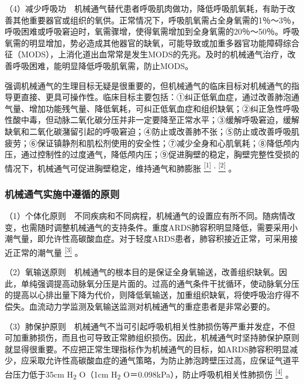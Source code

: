 （4）减少呼吸功　机械通气替代患者呼吸肌肉做功，降低呼吸肌氧耗，有助于改善其他重要器官或组织的氧供。正常情况下，呼吸肌氧需占全身氧需的1％～3％，呼吸困难或呼吸窘迫时，氧需骤增，使得氧需增加到全身氧需的20％～50％。呼吸氧需的明显增加，势必造成其他器官的缺氧，可能导致或加重多器官功能障碍综合征（MODS），上消化道出血常常是发生MODS的先兆。及时的机械通气治疗，改善呼吸困难，能明显降低呼吸肌氧需，防止MODS。

强调机械通气的生理目标无疑是很重要的，但机械通气的临床目标对机械通气的指导更直接、更具可操作性。临床目标主要包括：①纠正低氧血症，通过改善肺泡通气量、增加功能残气量、降低氧耗，可纠正低氧血症和组织缺氧；②纠正急性呼吸性酸中毒，但动脉二氧化碳分压并非一定要降至正常水平；③缓解呼吸窘迫，缓解缺氧和二氧化碳潴留引起的呼吸窘迫；④防止或改善肺不张；⑤防止或改善呼吸肌疲劳；⑥保证镇静剂和肌松剂使用的安全性；⑦减少全身和心肌氧耗；⑧降低颅内压，通过控制性的过度通气，降低颅内压；⑨促进胸壁的稳定，胸壁完整性受损的情况下，机械通气可促进胸壁稳定，维持通气和肺膨胀
\protect\hyperlink{text00016.htmlux5cux23ch1-15}{\textsuperscript{{[}1{]}}}
\textsuperscript{,}
\protect\hyperlink{text00016.htmlux5cux23ch2-15}{\textsuperscript{{[}2{]}}}
。

\subsubsection{机械通气实施中遵循的原则}

（1）个体化原则　不同疾病和不同病程，机械通气的设置应有所不同。随病情改变，也需随时调整机械通气的支持条件。重度ARDS肺容积明显降低，需要采用小潮气量，即允许性高碳酸血症。对于轻度ARDS患者，肺容积接近正常，可采用接近正常的潮气量
\protect\hyperlink{text00016.htmlux5cux23ch3-15}{\textsuperscript{{[}3{]}}}
。

（2）氧输送原则　机械通气的根本目的是保证全身氧输送，改善组织缺氧。因此，单纯强调提高动脉氧分压是片面的。过高的通气条件干扰循环，使动脉氧分压的提高以心排出量下降为代价，则降低氧输送，加重组织缺氧，将使呼吸治疗得不偿失。血流动力学监测及氧输送监测对机械通气的重症患者是非常必要的。

（3）肺保护原则　机械通气不当可引起呼吸机相关性肺损伤等严重并发症，不但可加重肺损伤，而且也可导致正常肺组织损伤。因此，机械通气时坚持肺保护原则就显得很重要。不应把正常生理指标作为机械通气的目标，如ARDS肺容积明显减少，应采取允许性高碳酸血症的通气策略，为防止肺泡跨壁压过高，应保证气道平台压力低于35cm
H\textsubscript{2} O（1cm H\textsubscript{2}
O＝0.098kPa），防止呼吸机相关性肺损伤
\protect\hyperlink{text00016.htmlux5cux23ch4-15}{\textsuperscript{{[}4{]}}}
。

